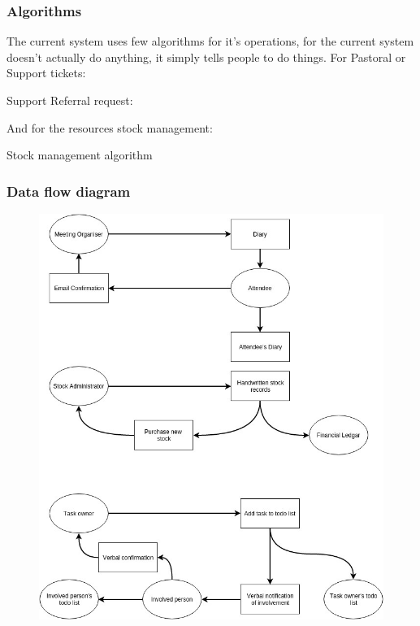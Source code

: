 \subsubsection{Algorithms}
 The current system uses few algorithms for it's operations, for the current system doesn't actually do anything, it simply tells people to do things.
For Pastoral or Support tickets:
\begin{algorithm}[H]
	\caption{Support Referral request:}
	\begin{algorithmic}[1]
		\Repeat
	\end{algorithmic}
\end{algorithm}

And for the resources stock management:
\begin{algorithm}[H]
	\caption{Stock management algorithm}
	\begin{algorithmic}[1]
		\EndIf
	\end{algorithmic}
\end{algorithm}

\subsubsection{Data flow diagram}

\begin{figure}[H]
	\includegraphics[width=\textwidth]{./Analysis/diagrams/dfc.jpg}
\end{figure}

